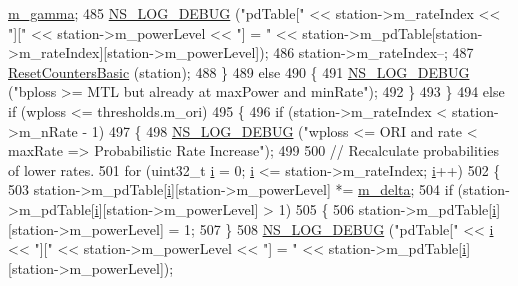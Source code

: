 \begin{DoxyCode}
      \hyperlink{classns3_1_1RrpaaWifiManager_ac328ed40e8e145afd21934caf52898b4}{m\_gamma};
485           \hyperlink{group__logging_ga413f1886406d49f59a6a0a89b77b4d0a}{NS\_LOG\_DEBUG} (\textcolor{stringliteral}{"pdTable["} << station->m\_rateIndex << \textcolor{stringliteral}{"]["} << station->m\_powerLevel << \textcolor{stringliteral}{
      "] = "} << station->m\_pdTable[station->m\_rateIndex][station->m\_powerLevel]);
486           station->m\_rateIndex--;
487           \hyperlink{classns3_1_1RrpaaWifiManager_a09b0daa8aa5414f393f6b8fb2a3043ca}{ResetCountersBasic} (station);
488         \}
489       \textcolor{keywordflow}{else}
490         \{
491           \hyperlink{group__logging_ga413f1886406d49f59a6a0a89b77b4d0a}{NS\_LOG\_DEBUG} (\textcolor{stringliteral}{"bploss >= MTL but already at maxPower and minRate"});
492         \}
493     \}
494   \textcolor{keywordflow}{else} \textcolor{keywordflow}{if} (wploss <= thresholds.m\_ori)
495     \{
496       \textcolor{keywordflow}{if} (station->m\_rateIndex < station->m\_nRate - 1)
497         \{
498           \hyperlink{group__logging_ga413f1886406d49f59a6a0a89b77b4d0a}{NS\_LOG\_DEBUG} (\textcolor{stringliteral}{"wploss <= ORI and rate < maxRate => Probabilistic Rate Increase"});
499 
500           \textcolor{comment}{// Recalculate probabilities of lower rates.}
501           \textcolor{keywordflow}{for} (uint32\_t \hyperlink{bernuolliDistribution_8m_a6f6ccfcf58b31cb6412107d9d5281426}{i} = 0; \hyperlink{bernuolliDistribution_8m_a6f6ccfcf58b31cb6412107d9d5281426}{i} <= station->m\_rateIndex; \hyperlink{bernuolliDistribution_8m_a6f6ccfcf58b31cb6412107d9d5281426}{i}++)
502             \{
503               station->m\_pdTable[\hyperlink{bernuolliDistribution_8m_a6f6ccfcf58b31cb6412107d9d5281426}{i}][station->m\_powerLevel] *= \hyperlink{classns3_1_1RrpaaWifiManager_aca7d4b5e9e8758b935433bc5c9ad24af}{m\_delta};
504               \textcolor{keywordflow}{if} (station->m\_pdTable[\hyperlink{bernuolliDistribution_8m_a6f6ccfcf58b31cb6412107d9d5281426}{i}][station->m\_powerLevel] > 1)
505                 \{
506                   station->m\_pdTable[\hyperlink{bernuolliDistribution_8m_a6f6ccfcf58b31cb6412107d9d5281426}{i}][station->m\_powerLevel] = 1;
507                 \}
508               \hyperlink{group__logging_ga413f1886406d49f59a6a0a89b77b4d0a}{NS\_LOG\_DEBUG} (\textcolor{stringliteral}{"pdTable["} << \hyperlink{bernuolliDistribution_8m_a6f6ccfcf58b31cb6412107d9d5281426}{i} << \textcolor{stringliteral}{"]["} << station->m\_powerLevel << \textcolor{stringliteral}{"] = "} << 
      station->m\_pdTable[\hyperlink{bernuolliDistribution_8m_a6f6ccfcf58b31cb6412107d9d5281426}{i}][station->m\_powerLevel]);

\end{DoxyCode}

